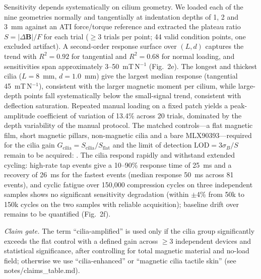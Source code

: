 Sensitivity depends systematically on cilium geometry. We loaded each of
the nine geometries normally and tangentially at indentation depths of 1, 2
and 3~mm against an ATI force/torque reference and extracted the plateau
ratio $S=|\Delta\mathbf{B}|/F$ for each trial ($\geq 3$ trials per point;
44 valid condition points, one excluded artifact). A second-order response
surface over $(L,d)$ captures the trend with $R^2=0.92$ for tangential and
$R^2=0.68$ for normal loading, and sensitivities span approximately
3--50~mT\,N$^{-1}$ (Fig.~2e). The longest and thickest cilia ($L=8$~mm,
$d=1.0$~mm) give the largest median response (tangential
45~mT\,N$^{-1}$), consistent with the larger magnetic moment per cilium,
while large-depth points fall systematically below the small-signal trend,
consistent with deflection saturation. Repeated manual loading on a fixed
patch yields a peak-amplitude coefficient of variation of 13.4\% across 20
trials, dominated by the depth variability of the manual protocol. The
matched controls---a flat magnetic film, short magnetic pillars,
non-magnetic cilia and a bare MLX90393---required for the cilia gain
$G_{\mathrm{cilia}}=S_{\mathrm{cilia}}/S_{\mathrm{flat}}$ and the limit of
detection $\mathrm{LOD}=3\sigma_B/S$ remain to be acquired:
. The cilia respond rapidly and
withstand extended cycling: high-rate tap events give a 10--90\% response
time of 25~ms and a recovery of 26~ms for the fastest events (median
response 50~ms across 81 events), and cyclic fatigue over 150{,}000
compression cycles on three independent samples shows no significant
sensitivity degradation (within $\pm$4\% from 50k to 150k cycles on the two
samples with reliable acquisition); baseline drift over
 remains to be quantified (Fig.~2f).

\noindent\textit{Claim gate.} The term ``cilia-amplified'' is used only if the
cilia group significantly exceeds the flat control with a defined gain across
$\geq 3$ independent devices and statistical significance, after controlling for
total magnetic material and no-load field; otherwise we use ``cilia-enhanced''
or ``magnetic cilia tactile skin'' (see notes/claims\_table.md).

